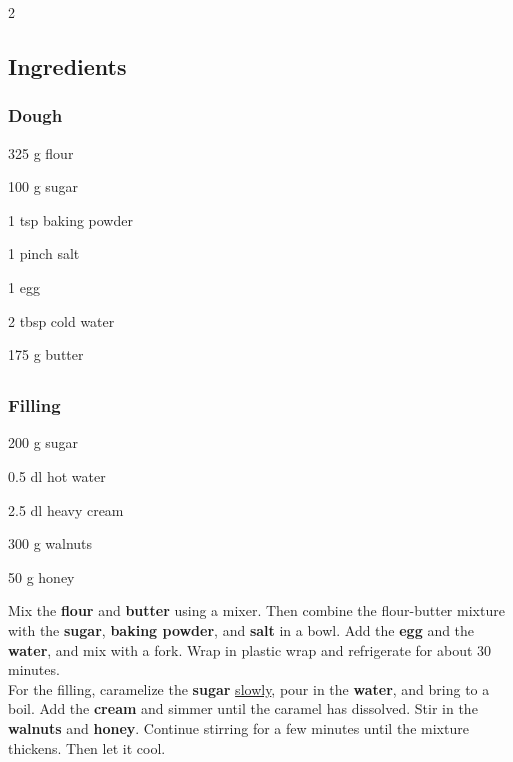 \newpage
{}
\label{bundner_nusstorte}

\begin{multicols}{2}
	\subsection*{Ingredients}
	\subsubsection*{Dough}
	\begin{ingredients}
		\item 325 g flour
		\item 100 g sugar
		\item 1 tsp baking powder
		\item 1 pinch salt
		\item 1 egg
		\item 2 tbsp cold water
		\item 175 g butter
	\end{ingredients}
	
	\columnbreak
	
	\subsection*{}
	\subsubsection*{Filling}
	\begin{equipment}
		\item 200 g sugar
		\item 0.5 dl hot water
		\item 2.5 dl heavy cream
		\item 300 g walnuts
		\item 50 g honey
	\end{equipment}
\end{multicols}

\medskip

Mix the \textbf{flour} and \textbf{butter} using a mixer.
Then combine the flour-butter mixture with the \textbf{sugar}, \textbf{baking powder}, and \textbf{salt} in a bowl.
Add the \textbf{egg} and the \textbf{water}, and mix with a fork.
Wrap in plastic wrap and refrigerate for about 30 minutes. \\

For the filling, caramelize the \textbf{sugar} \underline{slowly}, pour in the \textbf{water}, and bring to a boil.
Add the \textbf{cream} and simmer until the caramel has dissolved.
Stir in the \textbf{walnuts} and \textbf{honey}.
Continue stirring for a few minutes until the mixture thickens.
Then let it cool. \\

